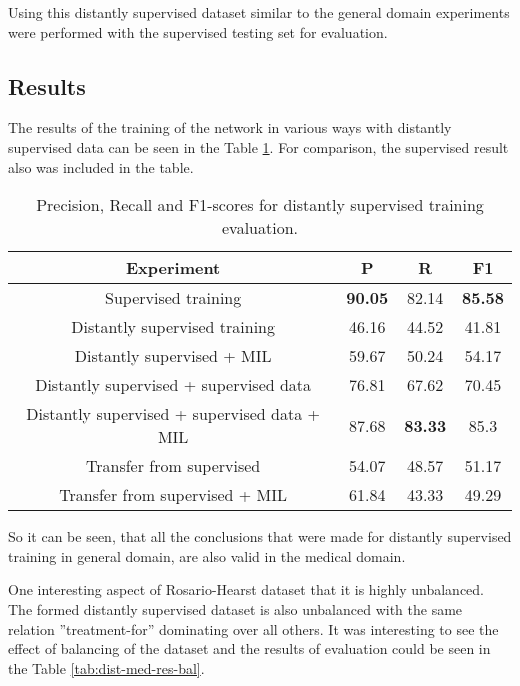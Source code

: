 Using this distantly supervised dataset similar to the general domain experiments were 
performed with the supervised testing set for evaluation.

\subsection{Results}
The results of the training of the network in various ways with distantly supervised data can be seen
in the Table \ref{tab:dist-med-res}. For comparison, the supervised result also was included in the 
table.

\begin{table}[h]
  \begin{center}
 \begin{tabular}{ | c | c | c | c | }
    \hline
    Experiment & P & R & F1 \\ \hline
    Supervised training & \textbf{90.05} & 82.14 & \textbf{85.58} \\ \hline
    Distantly supervised training & 46.16 & 44.52 & 41.81 \\ \hline
    Distantly supervised + MIL & 59.67 & 50.24 & 54.17 \\ \hline
    Distantly supervised + supervised data & 76.81 & 67.62 & 70.45 \\ \hline
    Distantly supervised + supervised data + MIL & 87.68 & \textbf{83.33} & 85.3 \\ \hline
    Transfer from supervised & 54.07 & 48.57 & 51.17 \\ \hline
    Transfer from supervised + MIL & 61.84 & 43.33 & 49.29 \\ \hline
    \end{tabular}
\caption[Medical domain, Distant Supervision experiments results]{Precision, Recall and F1-scores for distantly supervised training evaluation.}
\label{tab:dist-med-res}
\end{center}
\end{table}

So it can be seen, that all the conclusions that were made for distantly supervised training in 
general domain, are also valid in the medical domain.

One interesting aspect of Rosario-Hearst dataset that it is highly unbalanced. The formed 
distantly supervised dataset is also unbalanced with the same relation ''treatment-for'' 
dominating over all others. It was interesting to see the effect of balancing of the dataset and the 
results of evaluation could be seen in the Table \ref{tab:dist-med-res-bal}.

